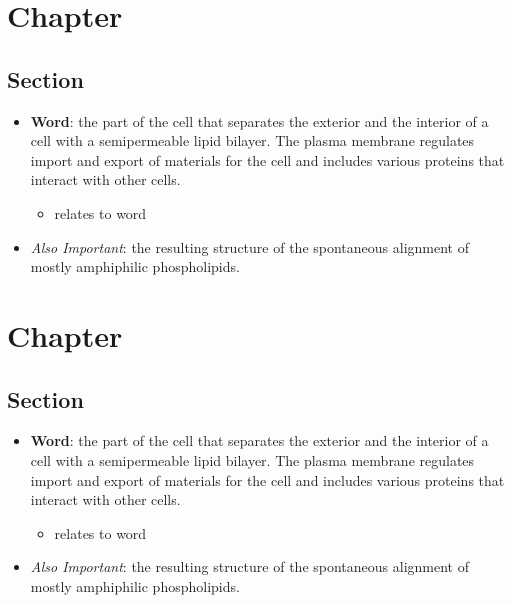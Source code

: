 \documentclass[12pt,a4paper]{article}
\begin{document}
\tableofcontents
\cleardoublepage
\fancyhead{}

\clearpage
\section{Chapter}
\subsection{Section}
\begin{itemize}
    \item \textbf{Word}: the part of the cell that separates the exterior and the interior of a cell with a semipermeable lipid bilayer. The plasma membrane regulates import and export of materials for the cell and includes various proteins that interact with other cells. 
    \begin{itemize}
        \item relates to word
    \end{itemize}
    \item \textit{Also Important}: the resulting structure of the spontaneous alignment of mostly amphiphilic phospholipids. 
\end{itemize}

\clearpage
\section{Chapter}
\subsection{Section}
\begin{itemize}
    \item \textbf{Word}: the part of the cell that separates the exterior and the interior of a cell with a semipermeable lipid bilayer. The plasma membrane regulates import and export of materials for the cell and includes various proteins that interact with other cells. 
    \begin{itemize}
        \item relates to word
    \end{itemize}
    \item \textit{Also Important}: the resulting structure of the spontaneous alignment of mostly amphiphilic phospholipids. 
\end{itemize}


\end{document}
